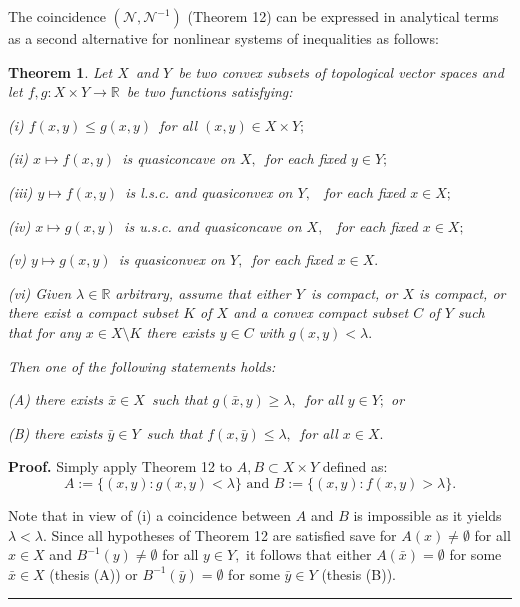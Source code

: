 \documentclass{article}
\newtheorem{theorem}{Theorem}
\newenvironment{proof}[1][Proof]{\noindent\textbf{#1.} }{\ \rule{0.5em}{0.5em}}
\begin{document}
The coincidence $(\mathcal{N},\mathcal{N}^{-1})$ (Theorem 12) can be
expressed in analytical terms as a second alternative for nonlinear systems
of inequalities as follows:

\begin{theorem}
\textit{Let }$X$\textit{\ and }$Y$\textit{\ be two convex subsets of
topological vector spaces and let }$f,g:X\times Y\longrightarrow 
\mathbb{R}
$\textit{\ be two functions satisfying:}

\textit{(i) }$f(x,y)\leq g(x,y)$\textit{\ for all }$(x,y)\in X\times Y;$

\textit{(ii) }$x\mapsto f(x,y)$\textit{\ is quasiconcave on }$X,$\textit{\
for each fixed }$y\in Y;$

\textit{(iii) }$y\mapsto f(x,y)$\textit{\ is l.s.c. and quasiconvex on }$Y,$%
\textit{\ for each fixed }$x\in X;$

\textit{(iv) }$x\mapsto g(x,y)$\textit{\ is u.s.c. and quasiconcave on }$X,$%
\textit{\ for each fixed }$x\in X;$

\textit{(v) }$y\mapsto g(x,y)$\textit{\ is quasiconvex on }$Y,$\textit{\ for
each fixed }$x\in X.$

(vi) \textit{Given }$\lambda \in 
\mathbb{R}
$ arbitrary, assume that \textit{either }$Y$\textit{\ is compact, or }$X$ is
compact\textit{, or there exist a compact subset }$K$ of $X$ and a convex
compact subset $C$ of $Y$ such that for any $x\in X\setminus K$ there exists 
$y\in C$ with $g(x,y)<\lambda .$

\textit{Then one of the following statements holds:}

(\textit{A) there exists }$\bar{x}\in X$\textit{\ such that }$g(\bar{x}%
,y)\geq \lambda ,$\textit{\ for all }$y\in Y;$ \textit{or}

(\textit{B) there exists }$\bar{y}\in Y$\textit{\ such that }$f(x,\bar{y}%
)\leq \lambda ,$\textit{\ for all }$x\in X.$
\end{theorem}

\begin{proof}
Simply apply Theorem 12 to $A,B\subset X\times Y$ defined as:%
\begin{equation*}
A:=\{(x,y):g(x,y)<\lambda \}\text{ and }B:=\{(x,y):f(x,y)>\lambda \}\text{.}
\end{equation*}

Note that in view of (i) a coincidence between $A$ and $B$ is impossible as
it yields $\lambda <\lambda .$ Since all hypotheses of Theorem 12 are
satisfied save for $A(x)\neq \emptyset $ for all $x\in X$ and $B^{-1}(y)\neq
\emptyset $ for all $y\in Y,$ it follows that either $A(\bar{x})=\emptyset $
for some $\bar{x}\in X$ (thesis (A)) or $B^{-1}(\bar{y})=\emptyset $ for
some $\bar{y}\in Y$ (thesis (B)).
\end{proof}
\end{document}
